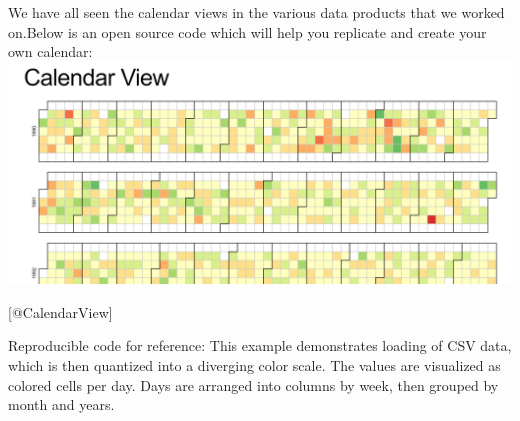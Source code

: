 \documentclass[]{book}
\theoremstyle{definition}
\theoremstyle{definition}
\theoremstyle{definition}
\theoremstyle{remark}
\begin{document}
We have all seen the calendar views in the various data products that we
worked on.Below is an open source code which will help you replicate and
create your own calendar: \includegraphics{images/CalendarView.jpg}

{[}@CalendarView{]}

Reproducible code for reference: This example demonstrates loading of
CSV data, which is then quantized into a diverging color scale. The
values are visualized as colored cells per day. Days are arranged into
columns by week, then grouped by month and years.
\end{document}
